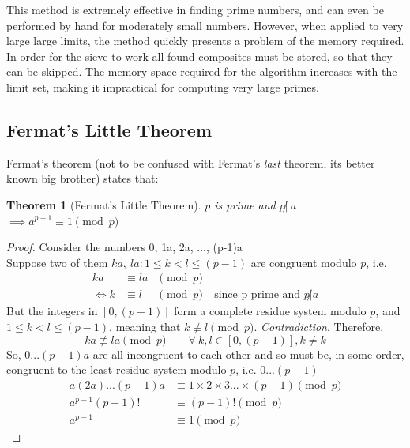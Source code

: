 \documentclass[12pt, titlepage]{article}
\newtheorem{theorem}{Theorem}
\begin{document}
    This method is extremely effective in finding prime numbers, and can even be performed
    by hand for moderately small numbers. However, when applied to very large large limits,
    the method quickly presents a problem of the memory required. In order for the sieve to
    work all found composites must be stored, so that they can be skipped. The memory space
    required for the algorithm increases with the limit set, making it impractical for
    computing very large primes.

    \subsection{Fermat's  Little Theorem}
    Fermat's theorem (not to be confused with Fermat's \emph{last} theorem, its better known
    big brother) states that:
    \begin{theorem}[Fermat's Little Theorem]
        $p$ is prime and $p \not|\ a$ $\implies a^{p-1} \equiv 1 \pmod{p}$
    \end{theorem}

    \begin{proof}
        Consider the numbers 0, 1a, 2a, ..., (p-1)a\\
        Suppose two of them $ka,\ la: 1\leq k < l \leq (p-1)$ are congruent modulo $p$, i.e. 
        \begin{align*}
                  ka &\equiv la &\pmod{p}&\\
            \iff  k  &\equiv l  &\pmod{p}&\ \text{since p prime and $p \not| a$}
        \end{align*}
        But the integers in $[0, (p-1)]$ form a complete residue system modulo $p$, and  $1
        \leq k<l \leq (p-1)$, meaning that $k \not\equiv l \pmod p$. \emph{Contradiction}.
        Therefore, 
        \begin{equation*}
            ka \not\equiv la \pmod{p}\qquad \forall\ k,l \in [0, (p-1)], k \not= k
        \end{equation*}    
        So, $0...(p-1)a$ are all incongruent to each other and so must be, in some order,
        congruent to the least residue system modulo $p$, i.e.  $0...(p-1)$
        \begin{align*}
            a(2a)...(p-1)a &\equiv 1\times 2\times 3...\times (p-1) \pmod{p}\\
            a^{p-1}(p-1)!  &\equiv (p-1)!                           \pmod{p}\\
            a^{p-1}        &\equiv 1                                \pmod{p}
        \end{align*}
    \end{proof}
            
\end{document}
